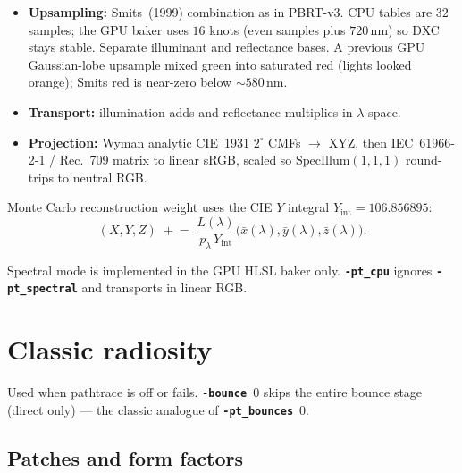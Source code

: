 \documentclass[11pt,a4paper]{article}
\newcommand{\flag}[1]{\texttt{\bfseries #1}}
\begin{document}
\begin{itemize}[leftmargin=1.4em]
  \item \textbf{Upsampling:} Smits~(1999) combination as in PBRT-v3.
        CPU tables are $32$ samples; the GPU baker uses $16$ knots (even samples
        plus $720\,\mathrm{nm}$) so DXC stays stable. Separate illuminant and
        reflectance bases. A previous GPU Gaussian-lobe upsample mixed green
        into saturated red (lights looked orange); Smits red is near-zero below
        $\sim 580\,\mathrm{nm}$.
  \item \textbf{Transport:} illumination adds and reflectance multiplies in
        $\lambda$-space.
  \item \textbf{Projection:} Wyman analytic CIE~1931 $2^\circ$ CMFs $\to$ XYZ,
        then IEC~61966-2-1 / Rec.~709 matrix to linear sRGB, scaled so
        $\mathrm{SpecIllum}(1,1,1)$ round-trips to neutral RGB.
\end{itemize}

Monte Carlo reconstruction weight uses the CIE $Y$ integral
$Y_{\mathrm{int}}=106.856895$:
\begin{equation}
  (X,Y,Z)
  \;+\!=\;
  \frac{L(\lambda)}{p_\lambda\, Y_{\mathrm{int}}}
  \bigl(\bar{x}(\lambda),\bar{y}(\lambda),\bar{z}(\lambda)\bigr).
\end{equation}

\begin{warnbox}
  Spectral mode is implemented in the GPU HLSL baker only.
  \flag{-pt\_cpu} ignores \flag{-pt\_spectral} and transports in linear RGB.
\end{warnbox}

\section{Classic radiosity}
\label{sec:radiosity}

Used when pathtrace is off or fails. \flag{-bounce}~$0$ skips the entire bounce
stage (direct only) --- the classic analogue of \flag{-pt\_bounces}~$0$.

\subsection{Patches and form factors}
\end{document}
